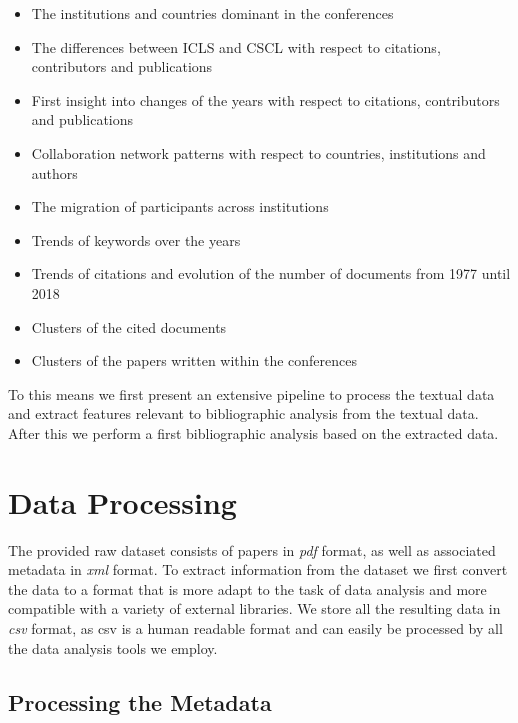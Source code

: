 \documentclass[article,twocolumn]{IEEEtran}
\providecommand{\tightlist}{%
      \setlength{\itemsep}{0pt}\setlength{\parskip}{0pt}}
\begin{document}
\begin{itemize}
\tightlist
\item
  The institutions and countries dominant in the conferences
\item
  The differences between ICLS and CSCL with respect to citations,
  contributors and publications
\item
  First insight into changes of the years with respect to citations,
  contributors and publications
\item
  Collaboration network patterns with respect to countries, institutions
  and authors
\item
  The migration of participants across institutions
\item
  Trends of keywords over the years
\item
  Trends of citations and evolution of the number of documents from 1977
  until 2018
\item
  Clusters of the cited documents
\item
  Clusters of the papers written within the conferences
\end{itemize}

To this means we first present an extensive pipeline to process the
textual data and extract features relevant to bibliographic analysis
from the textual data. After this we perform a first bibliographic
analysis based on the extracted data.

    \hypertarget{data-processing}{%
\section{Data Processing}\label{data-processing}}

    The provided raw dataset consists of papers in \emph{pdf} format, as
well as associated metadata in \emph{xml} format. To extract information
from the dataset we first convert the data to a format that is more
adapt to the task of data analysis and more compatible with a variety of
external libraries. We store all the resulting data in \emph{csv}
format, as csv is a human readable format and can easily be processed by
all the data analysis tools we employ.

    \hypertarget{processing-the-metadata}{%
\subsection{Processing the Metadata}\label{processing-the-metadata}}
\end{document}
